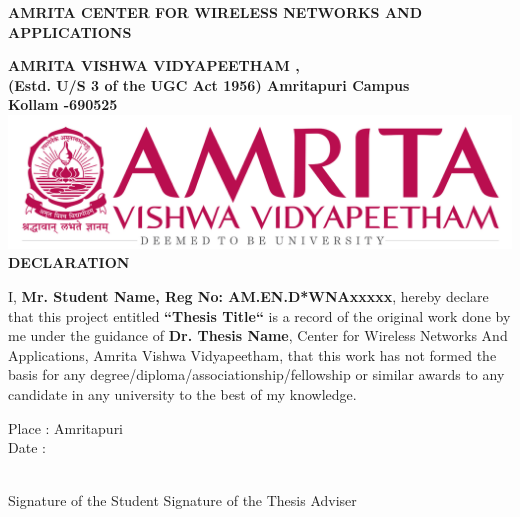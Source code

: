 \documentclass[oneside,times, 11pt,numbered,onehalfspacing]{CUEDthesisPSnPDF}
\begin{document}

\pagebreak
\begin{center}
  {\normalsize {\bfseries{AMRITA CENTER FOR WIRELESS NETWORKS AND APPLICATIONS	\\[1ex]}}}

    {\normalsize {\bfseries{AMRITA VISHWA VIDYAPEETHAM ,\\[1ex] (Estd. U/S 3 of the UGC Act 1956) Amritapuri  Campus \\[1ex] Kollam -690525\\[1ex]}}}
    \includegraphics[scale=1]{figs/amrita-logo.png}\\[1ex]
		
    \rmfamily\bfseries\upshape\Large
				DECLARATION \\[2ex]
    
    \end{center}
	\vspace{2pt}
I, \textbf{Mr. Student Name, Reg No: AM.EN.D*WNAxxxxx}, hereby declare that this project entitled \textbf{``Thesis Title``} is a record of the original work done by me under the guidance of \textbf{Dr. Thesis Name}, Center for Wireless Networks And Applications, Amrita Vishwa Vidyapeetham, that this work has not formed the basis for any degree/diploma/associationship/fellowship or similar awards to any candidate in any university to the best of my knowledge.

\vspace{60pt}
\begin{flushleft}
Place	:	Amritapuri\\[1ex]%

Date	:	\date{\today} \\[15ex]

Signature of the Student \hspace{116pt}	Signature of the Thesis Adviser
\end{flushleft}
\end{document}
